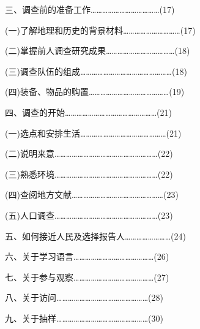 \documentclass[12pt,a4paper]{article}
\begin{document}
\noindent\hspace{1em}三、调查前的准备工作………………………………(17)



\noindent\hspace{2.5em}(一)了解地理和历史的背景材料…………………………(17)

\noindent\hspace{2.5em}(二)掌握前人调查研究成果………………………………(18)

\noindent\hspace{2.5em}(三)调查队伍的组成…………………………………………(18)

\noindent\hspace{2.5em}(四)装备、物品的购置……………………………………(19)



\noindent\hspace{1em}四、调查的开始…………………………………………(21)



\noindent\hspace{2.5em}(一)选点和安排生活………………………………………(21)

\noindent\hspace{2.5em}(二)说明来意………………………………………………(22)

\noindent\hspace{2.5em}(三)熟悉环境………………………………………………(22)

\noindent\hspace{2.5em}(四)查阅地方文献…………………………………………(23)

\noindent\hspace{2.5em}(五)人口调查………………………………………………(23)



\noindent\hspace{1em}五、如何接近人民及选择报告人……………………(24)



\noindent\hspace{1em}六、关于学习语言……………………………………(26)



\noindent\hspace{1em}七、关于参与观察……………………………………(27)



\noindent\hspace{1em}八、关于访问…………………………………………(28)



\noindent\hspace{1em}九、关于抽样…………………………………………(30)
\end{document}
